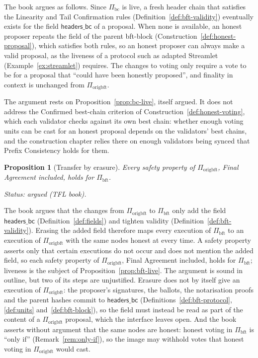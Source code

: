 \documentclass[11pt,a4paper]{article}
\newtheorem{proposition}[theorem]{Proposition}
\theoremstyle{definition}
\newcommand{\bc}{\mathrm{bc}}
\newcommand{\bft}{\mathrm{bft}}
\newcommand{\Piorigbft}{\Pi_{\mathrm{origbft}}}
\newcommand{\Pibc}{\Pi_{\bc}}
\newcommand{\Pibft}{\Pi_{\bft}}
\newcommand{\headersbc}{\mathsf{headers\_bc}}
\begin{document}
The book argues as follows. Since $\Pibc$ is live, a fresh header chain that
satisfies the Linearity and Tail Confirmation rules
(Definition~\ref{def:bft-validity}) eventually exists for the field
$\headersbc$ of a proposal. When none is available, an honest proposer
repeats the field of the parent bft-block
(Construction~\ref{def:honest-proposal}), which satisfies both rules, so an
honest proposer can always make a valid proposal, as the liveness of a
protocol such as adapted Streamlet (Example~\ref{ex:streamlet}) requires.
The changes to voting only require a vote to be for a proposal that ``could
have been honestly proposed'', and finality in context is unchanged from
$\Piorigbft$.

The argument rests on Proposition~\ref{prop:bc-live}, itself argued. It
does not address the Confirmed best-chain criterion of
Construction~\ref{def:honest-voting}, which each validator checks against
its own best chain: whether enough voting units can be cast for an honest
proposal depends on the validators' best chains, and the construction
chapter relies there on enough validators being synced that Prefix
Consistency holds for them.

\begin{proposition}[Transfer by erasure]\label{prop:erasure}
Every safety property of $\Piorigbft$, Final Agreement included, holds for
$\Pibft$.

Status: argued (TFL book).
\end{proposition}

The book argues that the changes from $\Piorigbft$ to $\Pibft$ only add the
field $\headersbc$ (Definition~\ref{def:fields}) and tighten validity
(Definition~\ref{def:bft-validity}). Erasing the added field therefore maps
every execution of $\Pibft$ to an execution of $\Piorigbft$ with the same
nodes honest at every time. A safety property asserts only that certain
executions do not occur and does not mention the added field, so each safety
property of $\Piorigbft$, Final Agreement included, holds for $\Pibft$;
liveness is the subject of Proposition~\ref{prop:bft-live}. The argument is
sound in outline, but two of its steps are unjustified. Erasure
does not by itself give an execution of $\Piorigbft$: the proposer's
signatures, the ballots, the notarisation proofs and the parent hashes
commit to $\headersbc$ (Definitions~\ref{def:bft-protocol}, \ref{def:units}
and~\ref{def:bft-block}), so the field must instead be read as part of the
content of a $\Piorigbft$ proposal, which the interface leaves open. And the
book asserts without argument that the same nodes are honest: honest voting
in $\Pibft$ is ``only if'' (Remark~\ref{rem:only-if}), so the image may
withhold votes that honest voting in $\Piorigbft$ would cast.
\end{document}
